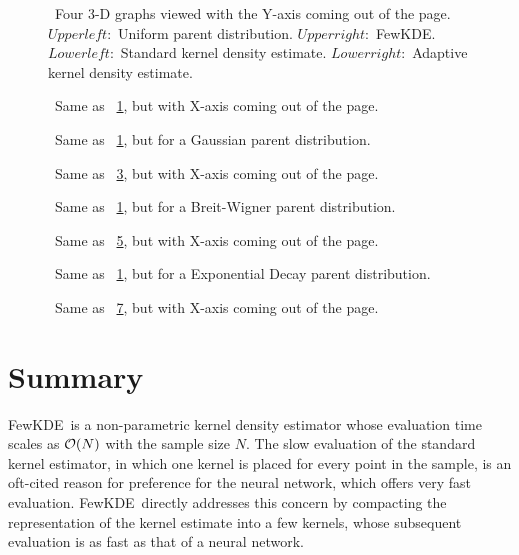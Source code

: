 \documentclass[prd,twocolumn]{revtex4}
\def\FewKDE{{\sc FewKDE}}
\def\nMC{N}
\begin{document}
\begin{figure}[htp]
\caption{\ Four 3-D graphs viewed with the Y-axis coming out of the page.  $Upper left:$ Uniform parent distribution.  $Upper right:$ FewKDE. $Lower left:$ Standard kernel density estimate. $Lower right:$ Adaptive kernel density estimate.}
\label{fig:2DboxY}
\end{figure}
\begin{figure}[htp]
\caption{\ Same as ~\ref{fig:2DboxY}, but with X-axis coming out of the page.}
\label{fig:2DboxX}
\end{figure}
\begin{figure}[htp]
\caption{\ Same as ~\ref{fig:2DboxY}, but for a Gaussian parent distribution.}
\label{fig:2DgaussY}
\end{figure}
\begin{figure}[htp]
\caption{\ Same as ~\ref{fig:2DgaussY}, but with X-axis coming out of the page.}
\label{fig:2DgaussX}
\end{figure}
\begin{figure}[htp]
\caption{\ Same as ~\ref{fig:2DboxY}, but for a Breit-Wigner parent distribution.}
\label{fig:2DbwY}
\end{figure}
\begin{figure}[htp]
\caption{\ Same as ~\ref{fig:2DbwY}, but with X-axis coming out of the page.}
\label{fig:2DbwX}
\end{figure}
\begin{figure}[htp]
\caption{\ Same as ~\ref{fig:2DboxY}, but for a Exponential Decay parent distribution.}
\label{fig:2DexpY}
\end{figure}
\begin{figure}[htp]
\caption{\ Same as ~\ref{fig:2DexpY}, but with X-axis coming out of the page.}
\label{fig:2DexpX}
\end{figure}

\section{Summary}

\FewKDE\ is a non-parametric kernel density estimator whose evaluation time scales as ${\cal O}(\nMC)$ with the sample size $\nMC$.  The slow evaluation of the standard kernel estimator, in which one kernel is placed for every point in the sample, is an oft-cited reason for preference for the neural network, which offers very fast evaluation.  \FewKDE\ directly addresses this concern by compacting the representation of the kernel estimate into a few kernels, whose subsequent evaluation is as fast as that of a neural network.
\end{document}
